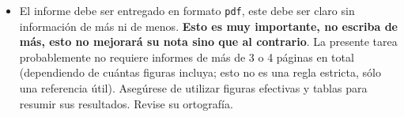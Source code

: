 \documentclass[letter, 11pt]{article}
\begin{document}
\begin{itemize}
\item El informe debe ser entregado en formato \texttt{pdf}, este debe ser
  claro sin información de más ni de menos. \textbf{Esto es muy importante, no
  escriba de más, esto no mejorará su nota sino que al contrario}. La presente
  tarea probablemente no requiere informes de más de 3 o 4 páginas en total
  (dependiendo de cuántas figuras incluya; esto no es una regla estricta, sólo
  una referencia útil).  Asegúrese de utilizar figuras efectivas y tablas para
  resumir sus resultados. Revise su ortografía.

\end{itemize}


\end{document}
